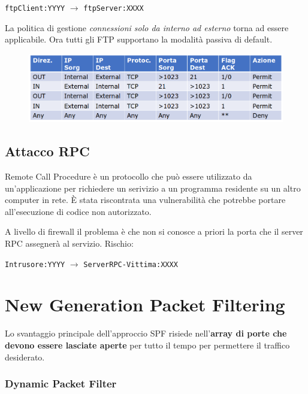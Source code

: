 \begin{center}
    \texttt{ftpClient:YYYY} $\rightarrow$ \texttt{ftpServer:XXXX}
\end{center}

La politica di gestione \textit{connessioni solo da interno ad esterno} torna 
ad essere applicabile. Ora tutti gli FTP supportano la modalità passiva di default.

\begin{figure}[H]
    \centering
    \includegraphics[width=1\linewidth]{chapters/12/images/ftp2.png}
\end{figure}

\subsection{Attacco RPC}
Remote Call Procedure è un protocollo che può essere utilizzato 
da un'applicazione per richiedere un serivizio a un programma residente su un 
altro computer in rete. 
\noindent È stata riscontrata una vulnerabilità che potrebbe portare all'esecuzione 
di codice non autorizzato.

\noindent A livello di firewall il problema è che non si conosce a priori la
porta che il server RPC assegnerà al servizio. Rischio:
\begin{center}
    \texttt{Intrusore:YYYY} $\rightarrow$ \texttt{ServerRPC-Vittima:XXXX}
\end{center}

\section{New Generation Packet Filtering}

Lo svantaggio principale dell'approccio SPF risiede nell'\textbf{array di porte 
che devono essere lasciate aperte} per tutto il tempo per permettere il 
traffico desiderato.

\subsubsection{Dynamic Packet Filter}

